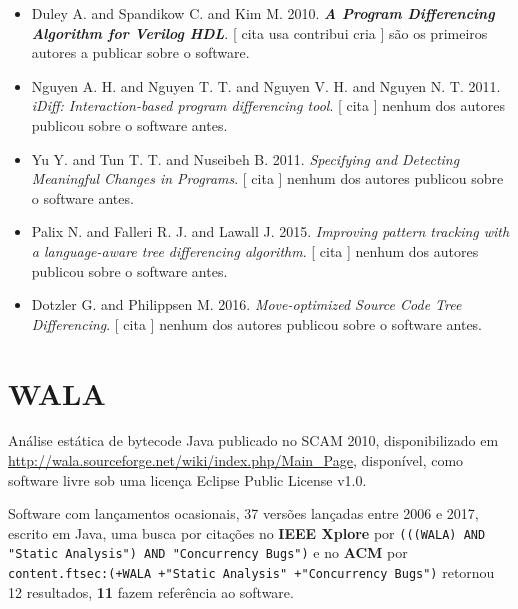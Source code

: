 \begin{itemize}
\item Duley A. and Spandikow C. and Kim M.
      2010.
        \textbf{\textit{ A Program Differencing Algorithm for Verilog HDL}}.
      [
          cita
          usa
          contribui
          cria
      ]
são os primeiros autores a publicar sobre o software.
\item Nguyen A. H. and Nguyen T. T. and Nguyen V. H. and Nguyen N. T.
      2011.
        \textit{ iDiff: Interaction-based program differencing tool}.
      [
          cita
      ]
nenhum dos autores publicou sobre o software antes.
\item Yu Y. and Tun T. T. and Nuseibeh B.
      2011.
        \textit{ Specifying and Detecting Meaningful Changes in Programs}.
      [
          cita
      ]
nenhum dos autores publicou sobre o software antes.
\item Palix N. and Falleri R. J. and Lawall J.
      2015.
        \textit{ Improving pattern tracking with a language-aware tree differencing algorithm}.
      [
          cita
      ]
nenhum dos autores publicou sobre o software antes.
\item Dotzler G. and Philippsen M.
      2016.
        \textit{ Move-optimized Source Code Tree Differencing}.
      [
          cita
      ]
nenhum dos autores publicou sobre o software antes.
\end{itemize}
\section{WALA}

Análise estática de bytecode Java
publicado no SCAM 2010,
disponibilizado em \url{http://wala.sourceforge.net/wiki/index.php/Main_Page},
disponível,
como software livre
sob uma licença Eclipse Public License v1.0.

Software com lançamentos ocasionais,
37 versões lançadas
entre 2006 e 2017,
escrito em Java,
uma busca por citações no {\bf IEEE Xplore} por
\texttt{(((WALA) AND "Static Analysis") AND "Concurrency Bugs")}
e no {\bf ACM} por
\texttt{content.ftsec:(+WALA +"Static Analysis" +"Concurrency Bugs")}
retornou
12 resultados,
{\bf 11} fazem referência ao software.


